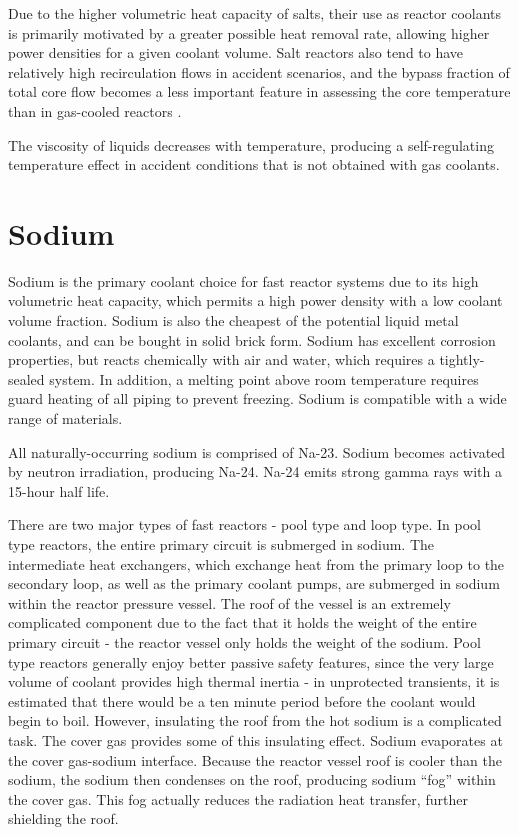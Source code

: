 \documentclass[10pt]{article}
\numberwithin{equation}{section} %
\begin{document}
Due to the higher volumetric heat capacity of salts, their use as reactor coolants is primarily motivated by a greater possible heat removal rate, allowing higher power densities for a given coolant volume. Salt reactors also tend to have relatively high recirculation flows in accident scenarios, and the bypass fraction of total core flow becomes a less important feature in assessing the core temperature than in gas-cooled reactors \cite{AHTR}. 

The viscosity of liquids decreases with temperature, producing a self-regulating temperature effect in accident conditions that is not obtained with gas coolants. 

\section{Sodium}

Sodium is the primary coolant choice for fast reactor systems due to its high volumetric heat capacity, which permits a high power density with a low coolant volume fraction. Sodium is also the cheapest of the potential liquid metal coolants, and can be bought in solid brick form. Sodium has excellent corrosion properties, but reacts chemically with air and water, which requires a tightly-sealed system. In addition, a melting point above room temperature requires guard heating of all piping to prevent freezing. Sodium is compatible with a wide range of materials. 

All naturally-occurring sodium is comprised of Na-23. Sodium becomes activated by neutron irradiation, producing Na-24. Na-24 emits strong gamma rays with a 15-hour half life. 

There are two major types of fast reactors - pool type and loop type. In pool type reactors, the entire primary circuit is submerged in sodium. The intermediate heat exchangers, which exchange heat from the primary loop to the secondary loop, as well as the primary coolant pumps, are submerged in sodium within the reactor pressure vessel. The roof of the vessel is an extremely complicated component due to the fact that it holds the weight of the entire primary circuit - the reactor vessel only holds the weight of the sodium. Pool type reactors generally enjoy better passive safety features, since the very large volume of coolant provides high thermal inertia - in unprotected transients, it is estimated that there would be a ten minute period before the coolant would begin to boil. However, insulating the roof from the hot sodium is a complicated task. The cover gas provides some of this insulating effect. Sodium evaporates at the cover gas-sodium interface. Because the reactor vessel roof is cooler than the sodium, the sodium then condenses on the roof, producing sodium ``fog'' within the cover gas. This fog actually reduces the radiation heat transfer, further shielding the roof. 
\end{document}
